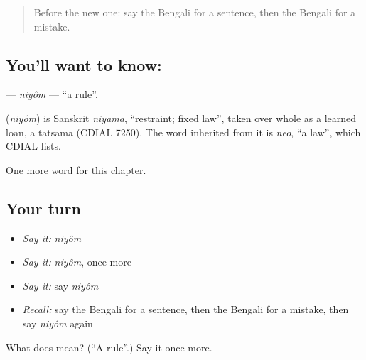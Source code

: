 \label{lesson:BN-C199-niyom}



\begin{quote}
Before the new one: say the Bengali for a sentence, then the Bengali for a mistake.
\end{quote}

\subsection*{You'll want to know: }
\textbf{} — \emph{niyôm} — \textquotedblleft{}a rule\textquotedblright{}.

\begin{cousinweb}
\textbf{} (\emph{niyôm}) is Sanskrit \emph{niyama}, \textquotedblleft{}restraint; fixed law\textquotedblright{}, taken over whole as a learned loan, a tatsama (CDIAL 7250). The word inherited from it is \emph{neo}, \textquotedblleft{}a law\textquotedblright{}, which CDIAL lists.
\end{cousinweb}

\begin{grammarlens}[title={What you've built}]
One more word for this chapter.
\end{grammarlens}

\subsection*{Your turn}
\begin{itemize}
\raggedright
  \item \emph{Say it:} \emph{niyôm}
  \item \emph{Say it:} \emph{niyôm}, once more
  \item \emph{Say it:} say \emph{niyôm}
  \item \emph{Recall:} say the Bengali for a sentence, then the Bengali for a mistake, then say \emph{niyôm} again
\end{itemize}

\begin{tcolorbox}[breakable,colback=teal!4,colframe=teal!35!black,title={Before you move on}]
What does  mean? (\textquotedblleft{}A rule\textquotedblright{}.) Say it once more.
\end{tcolorbox}
